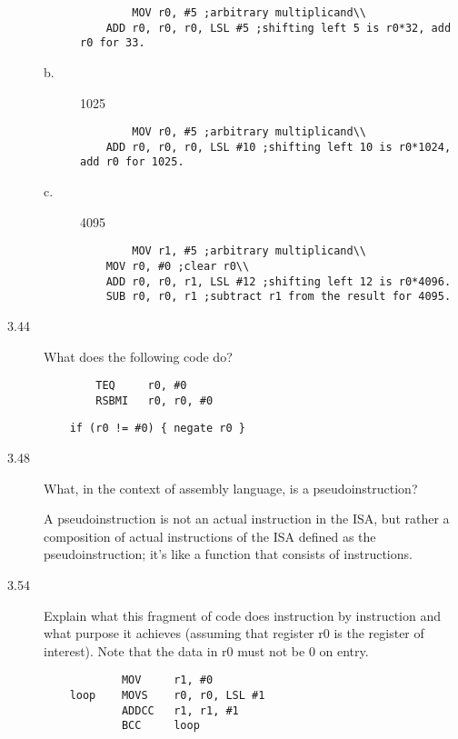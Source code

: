 \documentclass[letterpaper,10pt,titlepage]{article}
\begin{document}
\begin{description}
\begin{description}
        \begin{lstlisting}
        MOV r0, #5 ;arbitrary multiplicand\\
	ADD r0, r0, r0, LSL #5 ;shifting left 5 is r0*32, add r0 for 33.
    \end{lstlisting}
        \item[b.] 1025
        
        \begin{lstlisting}
        MOV r0, #5 ;arbitrary multiplicand\\
	ADD r0, r0, r0, LSL #10 ;shifting left 10 is r0*1024, add r0 for 1025.
    \end{lstlisting}
        \item[c.] 4095
        
        \begin{lstlisting}
        MOV r1, #5 ;arbitrary multiplicand\\
	MOV r0, #0 ;clear r0\\
	ADD r0, r0, r1, LSL #12 ;shifting left 12 is r0*4096.
	SUB r0, r0, r1 ;subtract r1 from the result for 4095.
    \end{lstlisting}
    \end{description}
    \item[3.44] What does the following code do?
    \begin{lstlisting}
        TEQ     r0, #0
        RSBMI   r0, r0, #0
    \end{lstlisting}
    
    \begin{lstlisting}
    if (r0 != #0) { negate r0 }
    \end{lstlisting}
    \item[3.48] What, in the context of assembly language, is a pseudoinstruction?
    
    A pseudoinstruction is not an actual instruction in the ISA, but rather a composition of actual instructions of the ISA defined as the pseudoinstruction; it's like a function that consists of instructions.
    \item[3.54] Explain what this fragment of code does instruction by instruction and what purpose it achieves (assuming that register r0 is the register of interest). Note that the data in r0 must not be 0 on entry.
    \begin{lstlisting}
            MOV     r1, #0
    loop    MOVS    r0, r0, LSL #1
            ADDCC   r1, r1, #1
            BCC     loop
    \end{lstlisting}
    

\end{description}
\end{document}
